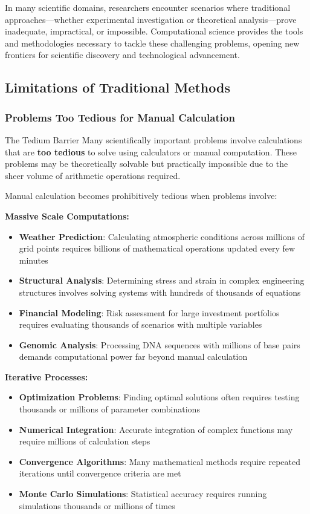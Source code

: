 In many scientific domains, researchers encounter scenarios where traditional approaches—whether experimental investigation or theoretical analysis—prove inadequate, impractical, or impossible. Computational science provides the tools and methodologies necessary to tackle these challenging problems, opening new frontiers for scientific discovery and technological advancement.

\subsection{Limitations of Traditional Methods}

\subsubsection{Problems Too Tedious for Manual Calculation}

\begin{warningbox}{The Tedium Barrier}
Many scientifically important problems involve calculations that are \textbf{too tedious} to solve using calculators or manual computation. These problems may be theoretically solvable but practically impossible due to the sheer volume of arithmetic operations required.
\end{warningbox}

Manual calculation becomes prohibitively tedious when problems involve:

\textbf{Massive Scale Computations:}
\begin{itemize}
    \item \textbf{Weather Prediction}: Calculating atmospheric conditions across millions of grid points requires billions of mathematical operations updated every few minutes
    \item \textbf{Structural Analysis}: Determining stress and strain in complex engineering structures involves solving systems with hundreds of thousands of equations
    \item \textbf{Financial Modeling}: Risk assessment for large investment portfolios requires evaluating thousands of scenarios with multiple variables
    \item \textbf{Genomic Analysis}: Processing DNA sequences with millions of base pairs demands computational power far beyond manual calculation
\end{itemize}

\textbf{Iterative Processes:}
\begin{itemize}
    \item \textbf{Optimization Problems}: Finding optimal solutions often requires testing thousands or millions of parameter combinations
    \item \textbf{Numerical Integration}: Accurate integration of complex functions may require millions of calculation steps
    \item \textbf{Convergence Algorithms}: Many mathematical methods require repeated iterations until convergence criteria are met
    \item \textbf{Monte Carlo Simulations}: Statistical accuracy requires running simulations thousands or millions of times
\end{itemize}

